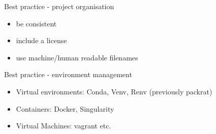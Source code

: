 \documentclass{beamer} %
\begin{document}
  \begin{frame}{Best practice - project organisation}
    \begin{itemize}
      \item be consistent
      \item include a license
      \item use machine/human readable filenames
    \end{itemize}
  \end{frame}


  \begin{frame}{Best practice - environment management}
    \begin{itemize}
      \item Virtual environments: Conda, Venv, Renv (previously packrat)
      \item Containers: Docker, Singularity
      \item Virtual Machines: vagrant etc.
    \end{itemize}
  \end{frame}
  
\end{document}
